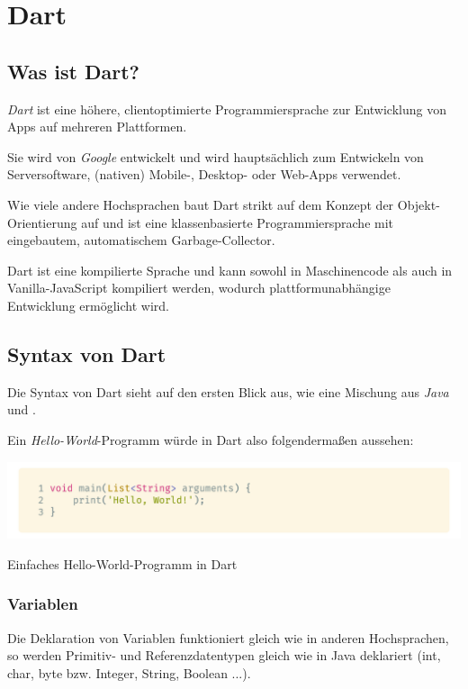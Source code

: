 \section{Dart}
\label{dart}

\subsection{Was ist Dart?}

\textit{Dart} ist eine höhere, clientoptimierte Programmiersprache zur Entwicklung von Apps auf mehreren Plattformen.

Sie wird von \textit{Google} entwickelt und wird hauptsächlich zum Entwickeln von Serversoftware, (nativen) Mobile-, Desktop- oder Web-Apps verwendet.

Wie viele andere Hochsprachen baut Dart strikt auf dem Konzept der Objekt-Orientierung auf und ist eine klassenbasierte Programmiersprache mit eingebautem, automatischem
Garbage-Collector.

Dart ist eine kompilierte Sprache und kann sowohl in Maschinencode als auch in Vanilla-JavaScript kompiliert werden, wodurch plattformunabhängige Entwicklung ermöglicht 
wird.

\subsection{Syntax von Dart}

Die Syntax von Dart sieht auf den ersten Blick aus, wie eine Mischung aus \textit{Java} und .

Ein \textit{Hello-World}-Programm würde in Dart also folgendermaßen aussehen:

\begin{code}[h]
    \centering
    \includegraphics[width=1\textwidth]{images/Dart/theory/dartHelloWorld.png}
    \caption{Einfaches Hello-World-Programm in Dart}
\end{code}

\subsubsection{Variablen}

Die Deklaration von Variablen funktioniert gleich wie in anderen Hochsprachen, so werden Primitiv- und Referenzdatentypen gleich wie in Java deklariert (int, char, byte bzw. Integer, String, Boolean ...).

